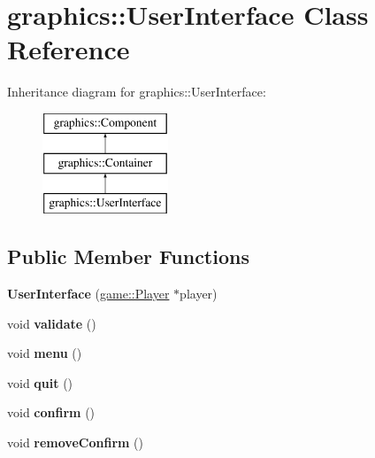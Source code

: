 \hypertarget{classgraphics_1_1_user_interface}{\section{graphics\-:\-:User\-Interface Class Reference}
\label{classgraphics_1_1_user_interface}
}
Inheritance diagram for graphics\-:\-:User\-Interface\-:\begin{figure}[H]
\begin{center}
\leavevmode
\includegraphics[height=3.000000cm]{classgraphics_1_1_user_interface}
\end{center}
\end{figure}
\subsection*{Public Member Functions}
\begin{DoxyCompactItemize}
\item 
\hypertarget{classgraphics_1_1_user_interface_a12a5266da257a31fa909b08d78eb2f73}{{\bfseries User\-Interface} (\hyperlink{classgame_1_1_player}{game\-::\-Player} $\ast$player)}\label{classgraphics_1_1_user_interface_a12a5266da257a31fa909b08d78eb2f73}

\item 
\hypertarget{classgraphics_1_1_user_interface_ad86cbe60aa83561a6dfd5550d8894733}{void {\bfseries validate} ()}\label{classgraphics_1_1_user_interface_ad86cbe60aa83561a6dfd5550d8894733}

\item 
\hypertarget{classgraphics_1_1_user_interface_acc8ffc05dd250bf37e55873d325cf888}{void {\bfseries menu} ()}\label{classgraphics_1_1_user_interface_acc8ffc05dd250bf37e55873d325cf888}

\item 
\hypertarget{classgraphics_1_1_user_interface_a12e98b38b56a9ac6e73f9dad60d9746f}{void {\bfseries quit} ()}\label{classgraphics_1_1_user_interface_a12e98b38b56a9ac6e73f9dad60d9746f}

\item 
\hypertarget{classgraphics_1_1_user_interface_a693b0f93fa9e199b043cbce06391e846}{void {\bfseries confirm} ()}\label{classgraphics_1_1_user_interface_a693b0f93fa9e199b043cbce06391e846}

\item 
\hypertarget{classgraphics_1_1_user_interface_a7427910c903bb9157965dfa0796910c4}{void {\bfseries remove\-Confirm} ()}\label{classgraphics_1_1_user_interface_a7427910c903bb9157965dfa0796910c4}

\end{DoxyCompactItemize}
